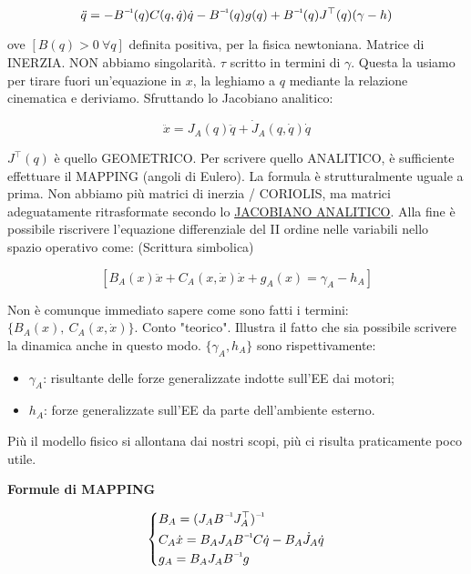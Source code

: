 \[
	\ddot{q} = -\inv{B}(q)C(q,\dot{q})\dot{q}-\inv{B}(q)g(q) + \inv{B}(q)J^\top(q)(\gamma-h)
\]

ove $[B(q)>0\ \forall q]$ definita positiva, per la fisica newtoniana. Matrice di INERZIA. NON abbiamo singolarità. $\tau$ scritto in termini di $\gamma$. Questa la usiamo per tirare fuori un'equazione in $x$, la leghiamo a $q$ mediante la relazione cinematica e deriviamo. Sfruttando lo Jacobiano analitico:

\[
	\ddot{x} = J_A(q)\ddot{q} + \dot{J}_A(q,\dot{q})\dot{q}
\]

$J^\top(q)$ è quello GEOMETRICO. Per scrivere quello ANALITICO, è sufficiente effettuare il MAPPING (angoli di Eulero). La formula è strutturalmente uguale a prima. Non abbiamo più matrici di inerzia / CORIOLIS, ma matrici adeguatamente ritrasformate secondo lo \underline{JACOBIANO ANALITICO}. Alla fine è possibile riscrivere l'equazione differenziale del II ordine nelle variabili nello spazio operativo come: (Scrittura simbolica)

\[
	[B_A(x)\ddot{x} + C_A(x,\dot{x})\dot{x} + g_A(x) = \gamma_A - h_A]
\]

Non è comunque immediato sapere come sono fatti i termini: $\{B_A(x),\ C_A(x,\dot{x})\}$. Conto "teorico". Illustra il fatto che sia possibile scrivere la dinamica anche in questo modo. $\{\gamma_A,h_A\}$ sono rispettivamente:

\begin{itemize}

\item{$\gamma_A$}: risultante delle forze generalizzate indotte sull'EE dai motori;
\item{$h_A$}: forze generalizzate sull'EE da parte dell'ambiente esterno.

\end{itemize}

Più il modello fisico si allontana dai nostri scopi, più ci risulta praticamente poco utile.

\begin{thrm}{\textbf{Formule di MAPPING}}

\[
	\left\{
	\begin{aligned}
	&B_A=\inv{(J_A\inv{B}J_A^\top)}\\
	&C_A\dot{x} = B_AJ_A\inv{B}C\dot{q} - B_A\dot{J}_A\dot{q}\\
	&g_A=B_AJ_A\inv{B}g
	\end{aligned}
	\right.
\]

\end{thrm}


